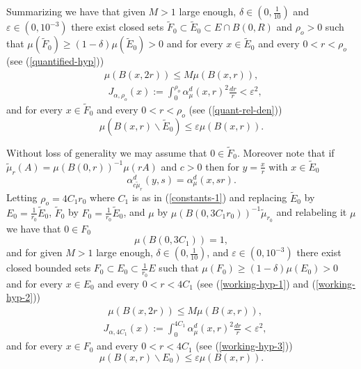 \documentclass[11pt]{amsart}
\newcommand{\rf}[1]{{(\ref{#1})}}
\newcommand{\ve}{{\varepsilon}}
\newcommand{\wt}[1]{{\widetilde{#1}}}
\theoremstyle{definition}
\theoremstyle{remark}
\numberwithin{equation}{section}
\newcommand{\jonas}[1]{}%
\begin{document}
Summarizing we have that given $M>1$ large enough, $\delta\in (0,\frac{1}{10})$ and $\ve\in (0,10^{-3})$ there exist closed sets $\wt F_0\subset \wt E_0\subset E\cap B(0,R)$ and $\rho_o>0$ such that  $\mu(\wt F_0)\ge(1-\delta)\mu(\wt E_0)>0$ and for 
every $x\in \wt E_0$ and every $0<r<\rho_o$ (see \rf{quantified-hyp})  
\begin{align}\label{working-hyp-1}
\mu(B(x,2r))\le M\mu(B(x,r)),
\end{align}
\begin{align}
&J_{\alpha, {\rho_o}}(x):=\int_{0}^{\rho_o} \alpha_{\mu}^{d}(x,r)^{2}\frac{dr}{r}<\ve^2,\label{working-hyp-2}
\end{align}
and for every $x\in \wt F_0$  and every $0<r<\rho_o$ (see  \rf{quant-rel-den})
\begin{equation}\label{working-hyp-3}
\mu(B(x,r)\backslash \wt E_0)\le \ve\mu(B(x,r)).
\end{equation}

Without loss of generality we may assume that $0\in \wt F_0$. Moreover note that if $\wt\mu_{r}(A) =\mu(B(0,r))^{-1}\mu(r A)$ and $c>0$ then for $y=\frac{x}{r}$ with $x\in \wt E_0$
 \begin{equation}\label{rescale-mu}
 \alpha_{c\wt\mu_r}^{d}(y,s)=\alpha_{\mu}^d(x,sr).
\end{equation}
Letting $\rho_o=4C_1r_0$ where $C_1$ is as in \rf{constants-1} and replacing $\wt E_0$ by $E_0=\frac{1}{r_0}\wt E_0$, $\wt F_0$ by $F_0=\frac{1}{r_0}\wt E_0$, and $\mu$ by 
$\mu(B(0,3C_1r_0))^{-1}\wt\mu_{r_0}$ and relabeling it $\mu$ we have that $0\in F_0$
\begin{equation}\label{meas=1}
\mu(B(0,3C_1))=1,
\end{equation}
and for given $M>1$ large enough, $\delta\in (0,\frac{1}{10})$, and $\ve\in (0,10^{-3})$ there exist closed bounded sets $ F_0\subset  E_0\subset \frac{1}{r_0} E$  such that  $\mu(F_0)\ge(1-\delta)\mu( E_0)>0$ and for 
every $x\in  E_0$ and every $0<r<4C_1$ (see \rf{working-hyp-1} and \rf{working-hyp-2})  
\begin{align}\label{working-hyp-1A}
&\mu(B(x,2r))\le M\mu(B(x,r)),\end{align}
\begin{align}
&J_{\alpha, {4C_1}}(x):=\int_{0}^{4C_1} \alpha_{\mu}^{d}(x,r)^{2}\frac{dr}{r}<\ve^2,\label{working-hyp-2A}
\end{align}
and for every $x\in  F_0$ and every $0<r<4C_1$ (see \rf{working-hyp-3})
\begin{equation}\label{working-hyp-3A}
\mu(B(x,r)\backslash E_0)\le \ve\mu(B(x,r)).
\end{equation}
\jonas{That could be the case, but yeah, probably best to not tinker too much with the machine at this point}
\end{document}
